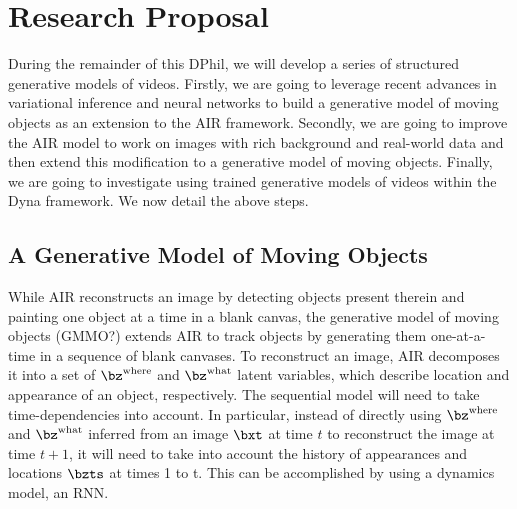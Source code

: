 \section{Research Proposal}
\label{sec:proposal}


    During the remainder of this DPhil, we will develop a series of structured generative models of videos.
    Firstly, we are going to leverage recent advances in variational inference and neural networks to build a generative model of moving objects as an extension to the AIR framework. 
    Secondly, we are going to improve the AIR model to work on images with rich background and real-world data and then extend this modification to a generative model of moving objects. 
    Finally, we are going to investigate using trained generative models of videos within the Dyna framework.
    We now detail the above steps.
    
    \subsection{A Generative Model of Moving Objects}
        While AIR reconstructs an image by detecting objects present therein and painting one object at a time in a blank canvas, the generative model of moving objects (GMMO?) extends AIR to track objects by generating them one-at-a-time in a sequence of blank canvases.
        To reconstruct an image, AIR decomposes it into a set of $\bz^{\mathrm{where}}$ and $\bz^{\mathrm{what}}$ latent variables, which describe location and appearance of an object, respectively.
        The sequential model will need to take time-dependencies into account.
        In particular, instead of directly using $\bz^{\mathrm{where}}$ and $\bz^{\mathrm{what}}$ inferred from an image $\bxt$ at time $t$ to reconstruct the image at time $t+1$, it will need to take into account the history of appearances and locations $\bzts$ at times 1 to t.
        This can be accomplished by using a dynamics model, \eg an RNN. 
        
